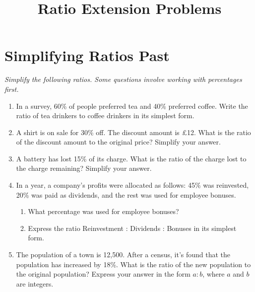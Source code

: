 \documentclass[12pt,a4paper]{article}
\title{Ratio Extension Problems}
\date{}
\begin{document}
\maketitle

\section*{Simplifying Ratios Past}
\emph{Simplify the following ratios. Some questions involve working with percentages first.}

\begin{enumerate}
\item In a survey, 60\% of people preferred tea and 40\% preferred coffee. Write the ratio of tea drinkers to coffee drinkers in its simplest form.

\vspace{1.2cm}

\item A shirt is on sale for 30\% off. The discount amount is £12. What is the ratio of the discount amount to the original price? Simplify your answer.

\vspace{1.2cm}

\item A battery has lost 15\% of its charge. What is the ratio of the charge lost to the charge remaining? Simplify your answer.

\vspace{1.2cm}

\item In a year, a company's profits were allocated as follows: 45\% was reinvested, 20\% was paid as dividends, and the rest was used for employee bonuses.
    \begin{enumerate}
    \item What percentage was used for employee bonuses?
    \item Express the ratio Reinvestment : Dividends : Bonuses in its simplest form.
    \end{enumerate}

\vspace{1.2cm}

\item The population of a town is 12,500. After a census, it's found that the population has increased by 18\%. What is the ratio of the new population to the original population? Express your answer in the form \( a : b \), where \( a \) and \( b \) are integers.

\end{enumerate}
\end{document}
